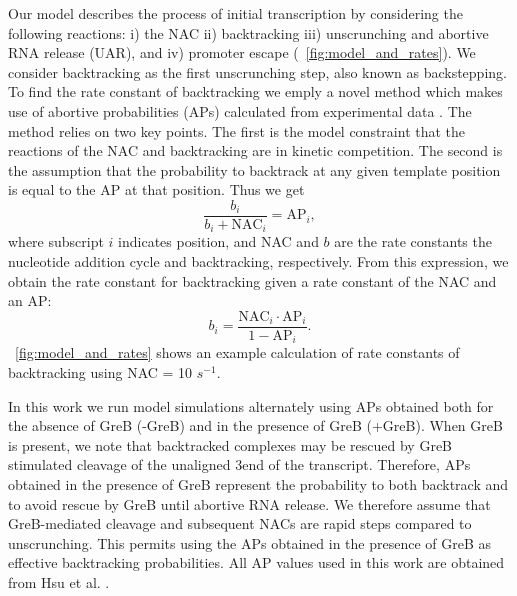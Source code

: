 %
Our model describes the process of initial transcription by considering the
following reactions: i) the NAC ii) backtracking iii) unscrunching and abortive
RNA release (UAR), and iv) promoter escape (\FIG~\ref{fig:model_and_rates}).
We consider backtracking as the first unscrunching step, also known as
backstepping. To find the rate constant of
backtracking we emply a novel method which makes use of abortive probabilities
(APs) calculated from experimental data \cite{hsu_quantitative_1996}. The
method relies on two key points. The first is the model constraint that the
reactions of the NAC and backtracking are in kinetic competition. The second
is the assumption that the probability to backtrack at any given template
position is equal to the AP at that position. Thus we get
\begin{equation*}
    \frac{b_i}{b_i + \text{NAC}_i} = \text{AP}_i,
\end{equation*}
where subscript $i$ indicates position, and NAC and $b$ are the rate constants
the nucleotide addition cycle and backtracking, respectively. From this
expression, we obtain the rate constant for backtracking given a rate constant
of the NAC and an AP:
\begin{equation}
  b_i = \frac{\text{NAC}_i\cdot\text{AP}_i}{1-\text{AP}_i}.
  \label{eq:backtrackingcalc}
\end{equation}
\FIG~\ref{fig:model_and_rates} shows an example calculation of rate constants
of backtracking using NAC = 10 $s^{-1}$.

In this work we run model simulations alternately using APs obtained both for
the absence of GreB (-GreB) and in the presence of GreB (+GreB). When GreB is
present, we note that backtracked complexes may be rescued by GreB stimulated
cleavage of the unaligned 3\ppp end of the transcript. Therefore, APs obtained
in the presence of GreB represent the probability to both backtrack and to
avoid rescue by GreB until abortive RNA release. We therefore assume that
GreB-mediated cleavage and subsequent NACs are rapid steps compared to
unscrunching. This permits using the APs obtained in the presence of GreB as
effective backtracking probabilities. All AP values used in this work are
obtained from Hsu et al. \cite{hsu_initial_2006}.

